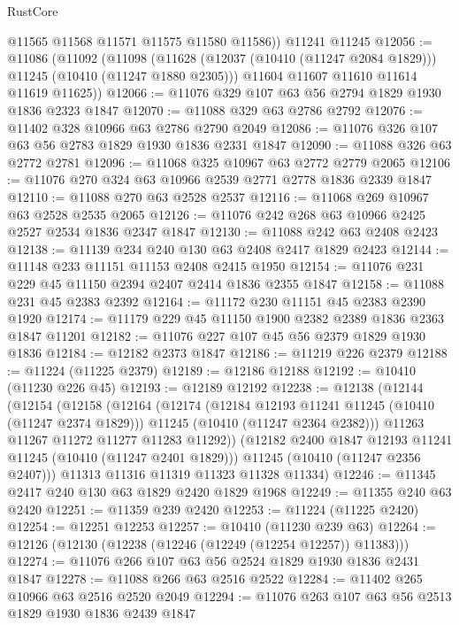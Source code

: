 \begin{lexlean}{RustCore}
\begin{coremodule}
        @11565
        @11568
        @11571
        @11575
        @11580
        @11586))
    @11241
    @11245
@12056 := @11086
    (@11092
      (@11098
        (@11628 (@12037 (@10410 (@11247 @2084 @1829))) @11245 (@10410 (@11247 @1880 @2305)))
        @11604
        @11607
        @11610
        @11614
        @11619
        @11625))
@12066 := @11076 @329 @107 @63 @56 @2794 @1829 @1930 @1836 @2323 @1847
@12070 := @11088 @329 @63 @2786 @2792
@12076 := @11402 @328 @10966 @63 @2786 @2790 @2049
@12086 := @11076 @326 @107 @63 @56 @2783 @1829 @1930 @1836 @2331 @1847
@12090 := @11088 @326 @63 @2772 @2781
@12096 := @11068 @325 @10967 @63 @2772 @2779 @2065
@12106 := @11076 @270 @324 @63 @10966 @2539 @2771 @2778 @1836 @2339 @1847
@12110 := @11088 @270 @63 @2528 @2537
@12116 := @11068 @269 @10967 @63 @2528 @2535 @2065
@12126 := @11076 @242 @268 @63 @10966 @2425 @2527 @2534 @1836 @2347 @1847
@12130 := @11088 @242 @63 @2408 @2423
@12138 := @11139 @234 @240 @130 @63 @2408 @2417 @1829 @2423
@12144 := @11148 @233 @11151 @11153 @2408 @2415 @1950
@12154 := @11076 @231 @229 @45 @11150 @2394 @2407 @2414 @1836 @2355 @1847
@12158 := @11088 @231 @45 @2383 @2392
@12164 := @11172 @230 @11151 @45 @2383 @2390 @1920
@12174 := @11179 @229 @45 @11150 @1900 @2382 @2389 @1836 @2363 @1847 @11201
@12182 := @11076 @227 @107 @45 @56 @2379 @1829 @1930 @1836
@12184 := @12182 @2373 @1847
@12186 := @11219 @226 @2379
@12188 := @11224 (@11225 @2379)
@12189 := @12186 @12188
@12192 := @10410 (@11230 @226 @45)
@12193 := @12189 @12192
@12238 := @12138
    (@12144
      (@12154
        (@12158
          (@12164
            (@12174
              (@12184 @12193 @11241 @11245 (@10410 (@11247 @2374 @1829)))
              @11245
              (@10410 (@11247 @2364 @2382)))
            @11263
            @11267
            @11272
            @11277
            @11283
            @11292))
        (@12182 @2400 @1847 @12193 @11241 @11245 (@10410 (@11247 @2401 @1829)))
        @11245
        (@10410 (@11247 @2356 @2407)))
      @11313
      @11316
      @11319
      @11323
      @11328
      @11334)
@12246 := @11345 @2417 @240 @130 @63 @1829 @2420 @1829 @1968
@12249 := @11355 @240 @63 @2420
@12251 := @11359 @239 @2420
@12253 := @11224 (@11225 @2420)
@12254 := @12251 @12253
@12257 := @10410 (@11230 @239 @63)
@12264 := @12126 (@12130 (@12238 (@12246 (@12249 (@12254 @12257)) @11383)))
@12274 := @11076 @266 @107 @63 @56 @2524 @1829 @1930 @1836 @2431 @1847
@12278 := @11088 @266 @63 @2516 @2522
@12284 := @11402 @265 @10966 @63 @2516 @2520 @2049
@12294 := @11076 @263 @107 @63 @56 @2513 @1829 @1930 @1836 @2439 @1847

\end{coremodule}
\end{lexlean}
